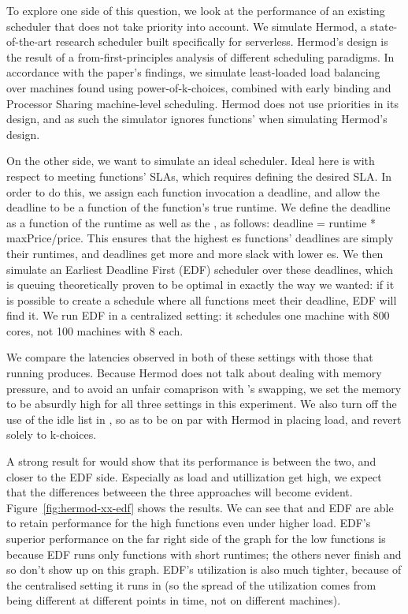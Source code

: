 To explore one side of this question, we look at the performance of an existing
scheduler that does not take priority into account. We simulate
Hermod\cite{hermod}, a state-of-the-art research scheduler built specifically
for serverless. Hermod's design is the result of a from-first-principles
analysis of different scheduling paradigms. In accordance with the paper's
findings, we simulate least-loaded load balancing over machines found using
power-of-k-choices, combined with early binding and Processor Sharing
machine-level scheduling. Hermod does not use priorities in its design, and as
such the simulator ignores functions' \class{} when simulating Hermod's design.


On the other side, we want to simulate an ideal scheduler. Ideal here is with
respect to meeting functions' SLAs, which requires defining the desired SLA. In
order to do this, we assign each function invocation a deadline, and allow the
deadline to be a function of the function's true runtime. We define the deadline
as a function of the runtime as well as the \priceclass{}, as follows: deadline
= runtime * maxPrice/price. This ensures that the highest \class{}es functions'
deadlines are simply their runtimes, and deadlines get more and more slack with
lower \class{}es. We then simulate an Earliest Deadline First (EDF) scheduler
over these deadlines, which is queuing theoretically proven to be optimal in
exactly the way we wanted: if it is possible to create a schedule where all
functions meet their deadline, EDF will find it\cite{wiki-edf}. We run EDF in a
centralized setting: it schedules one machine with 800 cores, not 100 machines
with 8 each.

We compare the latencies observed in both of these settings with those that
running \sys{} produces. Because Hermod does not talk about dealing with memory
pressure, and to avoid an unfair comaprison with \sys{}'s swapping, we set the
memory to be absurdly high for all three settings in this experiment. We also
turn off the use of the idle list in \sys{}, so as to be on par with Hermod in
placing load, and revert solely to k-choices.

A strong result for \sys{} would show that its performance is between the two,
and closer to the EDF side. Especially as load and utillization get high, we
expect that the differences betweeen the three approaches will become evident.
Figure~\ref{fig:hermod-xx-edf} shows the results. We can see that \sys{} and EDF
are able to retain performance for the high \class{} functions even under higher
load. EDF's superior performance on the far right side of the graph for the low
\class{} functions is because EDF runs only functions with short runtimes; the
others never finish and so don't show up on this graph. EDF's utilization is
also much tighter, because of the centralised setting it runs in (so the spread
of the utilization comes from being different at different points in time, not
on different machines).


